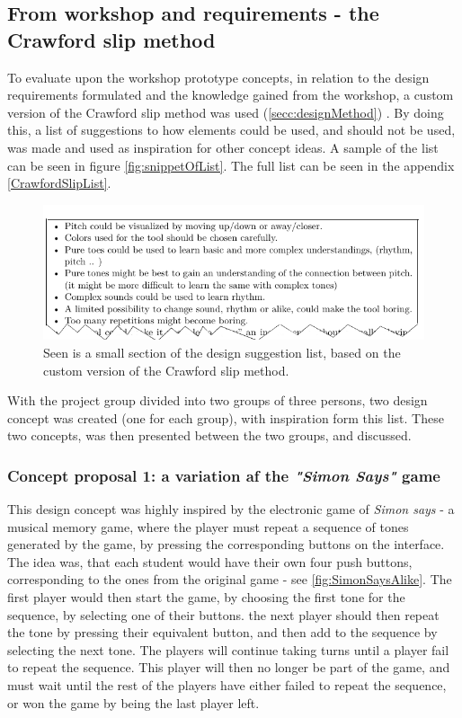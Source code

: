\subsection{From workshop and requirements - the Crawford slip method}
To evaluate upon the workshop prototype concepts, in relation to the design requirements formulated and the knowledge gained from the workshop, a custom version of the Crawford slip method was used (\autoref{secc:designMethod}) . By doing this, a list of suggestions to how elements could be used, and should not be used, was made and used as inspiration for other concept ideas. A sample of the list can be seen in figure \autoref{fig:snippetOfList}. The full list can be seen in the appendix \autoref{CrawfordSlipList}.  

\begin{figure}[H]
	\centering
	\includegraphics[width=0.7\linewidth]{figure/Design/snippetOfList} 
	\caption{Seen is a small section of the design suggestion list, based on the custom version of the Crawford slip method.}
	\label{fig:snippetOfList}
\end{figure}


With the project group divided into two groups of three persons, two design concept was created (one for each group), with inspiration form this list. These two concepts, was then presented between the two groups, and discussed.  

\subsubsection{Concept proposal 1: a variation af the \textit{"Simon Says"} game }
This design concept was highly inspired by the electronic game of \textit{Simon says} \cite{simonSays} - a musical memory game, where the player must repeat a sequence of tones generated by the game, by pressing the corresponding buttons on the interface. The idea was, that each student would have their own four push buttons, corresponding to the ones from the original game - see \autoref{fig:SimonSaysAlike}. The first player would then start the game, by choosing the first tone for the sequence, by selecting one of their buttons. the next player should then repeat the tone by pressing their equivalent button, and then add to the sequence by selecting the next tone. The players will continue taking turns until a player fail to repeat the sequence. This player will then no longer be part of the game, and must wait until the rest of the players have either failed to repeat the sequence, or won the game by being the last player left.

